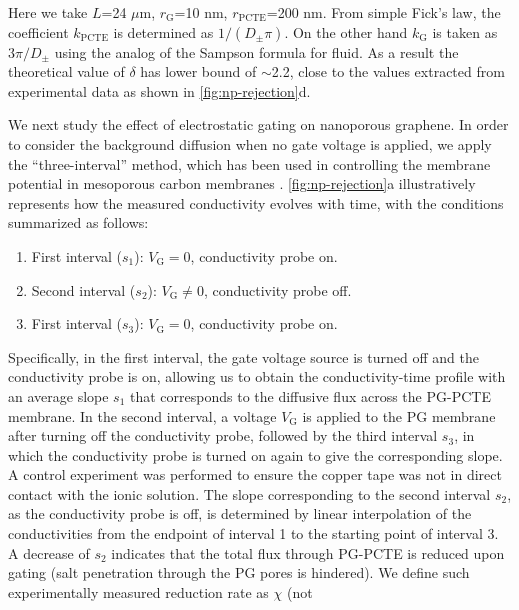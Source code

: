 Here we take $L$=24 $\mu$m, $r_{\mathrm{G}}$=10 nm,
$r_{\mathrm{PCTE}}$=200 nm. From simple Fick's law, the coefficient
$k_{\mathrm{PCTE}}$ is determined as $1/(D_{\mathrm{\pm}} \pi)$. On
the other hand $k_{\mathrm{G}}$ is taken as $3 \pi / D_{\mathrm{\pm}}$
using the analog of the Sampson formula for
fluid\cite{Roscoe_1949_sampson_formula}. As a result the theoretical
value of $\delta$ has lower bound of $\sim$2.2, close to the values
extracted from experimental data as shown in \autoref{fig:np-rejection}d.

  
We next study the effect of electrostatic gating on nanoporous graphene. 
In order to consider the background diffusion when no gate voltage is
applied, we apply the ``three-interval'' method, which has been used in
controlling the membrane potential in mesoporous carbon membranes
\cite{Surwade_2014_carbon_electrochemical_ion}.
%
\autoref{fig:np-rejection}a illustratively represents how the measured
conductivity evolves with time, with the conditions summarized as
follows:
\begin{enumerate}
\item First interval ($s_{1}$): $V_{\mathrm{G}} = 0$, conductivity probe on.
  
\item Second interval ($s_{2}$): $V_{\mathrm{G}} \neq 0$, conductivity probe off.

  \item First interval ($s_{3}$): $V_{\mathrm{G}} = 0$, conductivity probe on.
\end{enumerate}
Specifically, in the first interval,
the gate voltage source is turned off and the conductivity probe is
on, allowing us to obtain the conductivity-time profile with an
average slope $s_{1}$ that corresponds to the diffusive flux across
the PG-PCTE membrane. In the second interval, a voltage
$V_{\mathrm{G}}$ is applied to the PG membrane after turning off the
conductivity probe, followed by the third interval $s_{3}$, in which
the conductivity probe is turned on again to give the corresponding
slope. A control experiment was performed to ensure the copper tape
was not in direct contact with the ionic solution.
%
The slope corresponding to the
second interval $s_{2}$, as the conductivity probe is off, is
determined by linear interpolation of the conductivities from the
endpoint of interval 1 to the starting point of interval 3. A decrease
of $s_{2}$ indicates that the total flux through
PG-PCTE is reduced upon gating (\ie salt penetration through the PG
pores is hindered).
%
We define such experimentally measured reduction rate as $\chi$ (not
